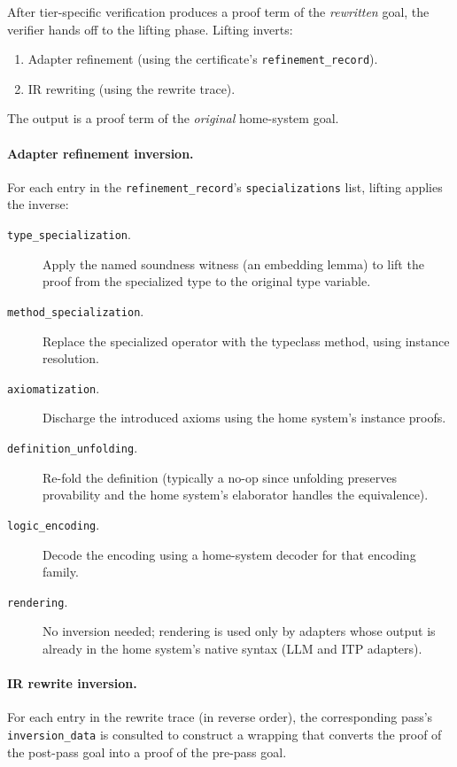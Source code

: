 \documentclass[11pt,letterpaper]{article}
\theoremstyle{definition}
\theoremstyle{remark}
\begin{document}
After tier-specific verification produces a proof term of the
\emph{rewritten} goal, the verifier hands off to the lifting phase.
Lifting inverts:

\begin{enumerate}[leftmargin=2em]
  \item Adapter refinement (using the certificate's
        \texttt{refinement\_record}).
  \item IR rewriting (using the rewrite trace).
\end{enumerate}

The output is a proof term of the \emph{original} home-system goal.

\paragraph{Adapter refinement inversion.} For each entry in the
\texttt{refinement\_record}'s \texttt{specializations} list, lifting
applies the inverse:

\begin{description}
  \item[\texttt{type\_specialization}.] Apply the named soundness
        witness (an embedding lemma) to lift the proof from the
        specialized type to the original type variable.
  \item[\texttt{method\_specialization}.] Replace the specialized
        operator with the typeclass method, using instance resolution.
  \item[\texttt{axiomatization}.] Discharge the introduced axioms
        using the home system's instance proofs.
  \item[\texttt{definition\_unfolding}.] Re-fold the definition
        (typically a no-op since unfolding preserves provability and
        the home system's elaborator handles the equivalence).
  \item[\texttt{logic\_encoding}.] Decode the encoding using a
        home-system decoder for that encoding family.
  \item[\texttt{rendering}.] No inversion needed; rendering is
        used only by adapters whose output is already in the home
        system's native syntax (LLM and ITP adapters).
\end{description}

\paragraph{IR rewrite inversion.} For each entry in the rewrite trace
(in reverse order), the corresponding pass's \texttt{inversion\_data}
is consulted to construct a wrapping that converts the proof of the
post-pass goal into a proof of the pre-pass goal.
\end{document}
